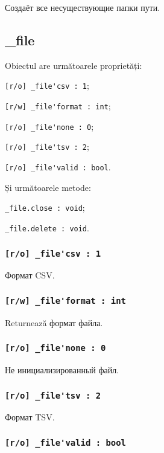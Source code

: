 Создаёт все несуществующие папки пути.

\subsection{{\color{orange} \_file}}

Obiectul \file{} are următoarele proprietăți:
\begin{icItems}
	\item \lstinline|[r/o] _file'csv : 1|;
	\item \lstinline|[r/w] _file'format : int|;
	\item \lstinline|[r/o] _file'none : 0|;
	\item \lstinline|[r/o] _file'tsv : 2|;
	\item \lstinline|[r/o] _file'valid : bool|.
\end{icItems}

Și următoarele metode:
\begin{icItems}
	\item \lstinline|_file.close : void|;
	\item \lstinline|_file.delete : void|.
\end{icItems}

\subsubsection{\lstinline|[r/o] _file'csv : 1|}

Формат CSV.

\subsubsection{\lstinline|[r/w] _file'format : int|}

Returnează формат файла.

\subsubsection{\lstinline|[r/o] _file'none : 0|}

Не инициализированный файл.

\subsubsection{\lstinline|[r/o] _file'tsv : 2|}

Формат TSV.

\subsubsection{\lstinline|[r/o] _file'valid : bool|}

